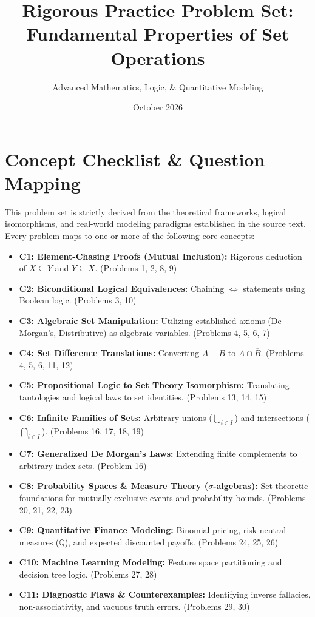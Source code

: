 \documentclass[12pt]{article}
\title{\textbf{Rigorous Practice Problem Set:\\ Fundamental Properties of Set Operations}}
\author{Advanced Mathematics, Logic, \& Quantitative Modeling}
\date{October 2026}
\theoremstyle{definition}
\begin{document}
\maketitle

\tableofcontents
\newpage

\section{Concept Checklist \& Question Mapping}
\label{sec:checklist_start}

This problem set is strictly derived from the theoretical frameworks, logical isomorphisms, and real-world modeling paradigms established in the source text. Every problem maps to one or more of the following core concepts:

\begin{itemize}
    \item \textbf{C1: Element-Chasing Proofs (Mutual Inclusion):} Rigorous deduction of $X \subseteq Y$ and $Y \subseteq X$. (Problems 1, 2, 8, 9)
    \item \textbf{C2: Biconditional Logical Equivalences:} Chaining $\iff$ statements using Boolean logic. (Problems 3, 10)
    \item \textbf{C3: Algebraic Set Manipulation:} Utilizing established axioms (De Morgan's, Distributive) as algebraic variables. (Problems 4, 5, 6, 7)
    \item \textbf{C4: Set Difference Translations:} Converting $A - B$ to $A \cap \overline{B}$. (Problems 4, 5, 6, 11, 12)
    \item \textbf{C5: Propositional Logic to Set Theory Isomorphism:} Translating tautologies and logical laws to set identities. (Problems 13, 14, 15)
    \item \textbf{C6: Infinite Families of Sets:} Arbitrary unions ($\bigcup_{i \in I}$) and intersections ($\bigcap_{i \in I}$). (Problems 16, 17, 18, 19)
    \item \textbf{C7: Generalized De Morgan's Laws:} Extending finite complements to arbitrary index sets. (Problem 16)
    \item \textbf{C8: Probability Spaces \& Measure Theory ($\sigma$-algebras):} Set-theoretic foundations for mutually exclusive events and probability bounds. (Problems 20, 21, 22, 23)
    \item \textbf{C9: Quantitative Finance Modeling:} Binomial pricing, risk-neutral measures ($\mathbb{Q}$), and expected discounted payoffs. (Problems 24, 25, 26)
    \item \textbf{C10: Machine Learning Modeling:} Feature space partitioning and decision tree logic. (Problems 27, 28)
    \item \textbf{C11: Diagnostic Flaws \& Counterexamples:} Identifying inverse fallacies, non-associativity, and vacuous truth errors. (Problems 29, 30)
\end{itemize}
\end{document}
